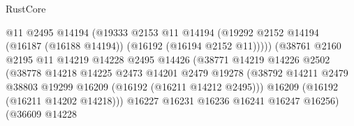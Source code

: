 \begin{lexlean}{RustCore}
\begin{coremodule}
                                            @11
                                            @2495
                                            @14194
                                            (@19333
                                              @2153
                                              @11
                                              @14194
                                              (@19292
                                                @2152
                                                @14194
                                                (@16187 (@16188 @14194))
                                                (@16192 (@16194 @2152 @11)))))
                                          (@38761
                                            @2160
                                            @2195
                                            @11
                                            @14219
                                            @14228
                                            @2495
                                            @14426
                                            (@38771
                                              @14219
                                              @14226
                                              @2502
                                              (@38778
                                                @14218
                                                @14225
                                                @2473
                                                @14201
                                                @2479
                                                @19278
                                                (@38792
                                                  @14211
                                                  @2479
                                                  @38803
                                                  @19299
                                                  @16209
                                                  (@16192 (@16211 @14212 @2495)))
                                                @16209
                                                (@16192 (@16211 @14202 @14218)))
                                              @16227
                                              @16231
                                              @16236
                                              @16241
                                              @16247
                                              @16256)
                                            (@36609
                                              @14228

\end{coremodule}
\end{lexlean}
